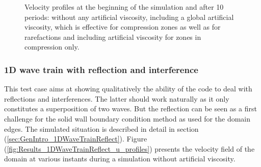 \documentclass{report}
\begin{document}
\begin{figure}[h]
{}
\caption[Velocity profiles 1D traveling wave]{Velocity profiles at the beginning of the simulation and after 10 periods:  without any artificial viscosity,  including a global artificial viscosity, which is effective for compression zones as well as for rarefactions and  including artificial viscosity for zones in compression only.}

\end{figure}


\subsubsection{1D wave train with reflection and interference}
This test case aims at showing qualitatively the ability of the code to deal with reflections and interferences. The latter should work naturally as it only constitutes a superposition of two waves. But the reflection can be seen as a first challenge for the solid wall boundary condition method as used for the domain edges.
The simulated situation is described in detail in section (\ref{sec:GenIntro_1DWaveTrainReflect}). Figure (\ref{fig:Results_1DWaveTrainReflect_u_profiles}) presents the velocity field of the domain at various instants during a simulation without artificial viscosity.
\end{document}

